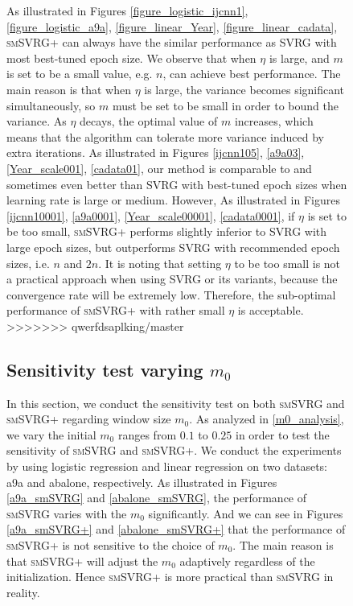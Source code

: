 \documentclass[conference]{IEEEtran}
\begin{document}
\begin{itemize}
\begin{figure}[ht]
As illustrated in Figures \ref{figure_logistic_ijcnn1}, \ref{figure_logistic_a9a}, \ref{figure_linear_Year}, \ref{figure_linear_cadata},  \textsc{smSVRG+} can always have the similar performance as SVRG with most best-tuned epoch size. We observe that when $\eta$ is large,  and $m$ is set to be a small value, e.g. $n$, can achieve best performance. The main reason is that when $\eta$ is large, the variance becomes significant simultaneously, so $m$ must be set to be small in order to bound the variance. As $\eta$ decays, the optimal value of $m$ increases, which means that the algorithm can tolerate more variance induced by extra iterations. As illustrated in Figures \ref{ijcnn105}, \ref{a9a03}, \ref{Year_scale001}, \ref{cadata01}, our method is comparable to and sometimes even better than SVRG with best-tuned epoch sizes when learning rate is large or medium. However, As illustrated in Figures \ref{ijcnn10001}, \ref{a9a0001}, \ref{Year_scale00001}, \ref{cadata0001}, if $\eta$ is set to be too small, \textsc{smSVRG+} performs slightly inferior to  SVRG with large epoch sizes, but outperforms SVRG with recommended epoch sizes, i.e. $n$ and $2n$. It is noting that setting $\eta$ to be too small is not a practical approach when using SVRG or its variants, because the convergence rate will be extremely low. Therefore, the sub-optimal performance of \textsc{smSVRG+} with rather small $\eta$ is acceptable.
>>>>>>> qwerfdsaplking/master
 
\subsection{Sensitivity test varying  $m_0$}
In this section, we conduct the sensitivity test on both \textsc{smSVRG} and \textsc{smSVRG+} regarding window size $m_0$. As analyzed in \ref{m0_analysis}, we vary the initial $m_0$ ranges from $0.1$ to $0.25$ in order to test the sensitivity of \textsc{smSVRG} and \textsc{smSVRG+}. We conduct the experiments by using logistic regression and linear regression on two datasets: a9a and abalone, respectively. As illustrated in Figures \ref{a9a_smSVRG} and \ref{abalone_smSVRG}, the performance of \textsc{smSVRG} varies with the $m_0$ significantly. And we can see in Figures \ref{a9a_smSVRG+} and \ref{abalone_smSVRG+} that the performance of \textsc{smSVRG+} is not sensitive to the choice of $m_0$. The main reason is that \textsc{smSVRG+} will adjust the $m_0$ adaptively regardless of the initialization. 
Hence \textsc{smSVRG+} is more practical than \textsc{smSVRG} in reality.


\end{figure}
\end{itemize}
\end{document}

